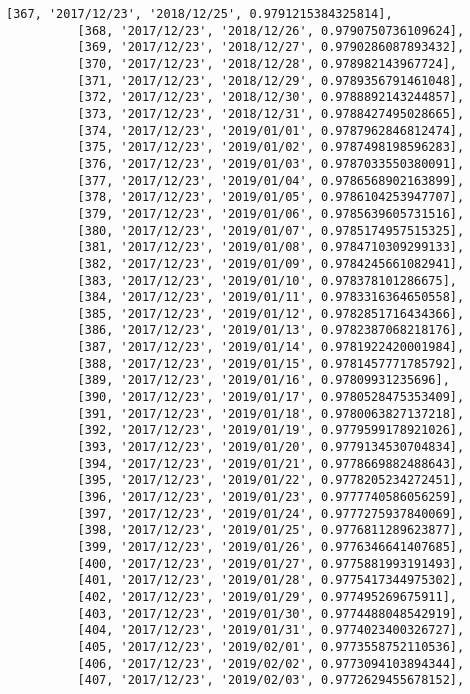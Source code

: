 \documentclass[11pt]{article}
\begin{document}
\begin{Verbatim}[commandchars=\\\{\}]
          [367, '2017/12/23', '2018/12/25', 0.9791215384325814],
          [368, '2017/12/23', '2018/12/26', 0.9790750736109624],
          [369, '2017/12/23', '2018/12/27', 0.9790286087893432],
          [370, '2017/12/23', '2018/12/28', 0.978982143967724],
          [371, '2017/12/23', '2018/12/29', 0.9789356791461048],
          [372, '2017/12/23', '2018/12/30', 0.9788892143244857],
          [373, '2017/12/23', '2018/12/31', 0.9788427495028665],
          [374, '2017/12/23', '2019/01/01', 0.9787962846812474],
          [375, '2017/12/23', '2019/01/02', 0.9787498198596283],
          [376, '2017/12/23', '2019/01/03', 0.9787033550380091],
          [377, '2017/12/23', '2019/01/04', 0.9786568902163899],
          [378, '2017/12/23', '2019/01/05', 0.9786104253947707],
          [379, '2017/12/23', '2019/01/06', 0.9785639605731516],
          [380, '2017/12/23', '2019/01/07', 0.9785174957515325],
          [381, '2017/12/23', '2019/01/08', 0.9784710309299133],
          [382, '2017/12/23', '2019/01/09', 0.9784245661082941],
          [383, '2017/12/23', '2019/01/10', 0.978378101286675],
          [384, '2017/12/23', '2019/01/11', 0.9783316364650558],
          [385, '2017/12/23', '2019/01/12', 0.9782851716434366],
          [386, '2017/12/23', '2019/01/13', 0.9782387068218176],
          [387, '2017/12/23', '2019/01/14', 0.9781922420001984],
          [388, '2017/12/23', '2019/01/15', 0.9781457771785792],
          [389, '2017/12/23', '2019/01/16', 0.97809931235696],
          [390, '2017/12/23', '2019/01/17', 0.9780528475353409],
          [391, '2017/12/23', '2019/01/18', 0.9780063827137218],
          [392, '2017/12/23', '2019/01/19', 0.9779599178921026],
          [393, '2017/12/23', '2019/01/20', 0.9779134530704834],
          [394, '2017/12/23', '2019/01/21', 0.9778669882488643],
          [395, '2017/12/23', '2019/01/22', 0.9778205234272451],
          [396, '2017/12/23', '2019/01/23', 0.9777740586056259],
          [397, '2017/12/23', '2019/01/24', 0.9777275937840069],
          [398, '2017/12/23', '2019/01/25', 0.9776811289623877],
          [399, '2017/12/23', '2019/01/26', 0.9776346641407685],
          [400, '2017/12/23', '2019/01/27', 0.9775881993191493],
          [401, '2017/12/23', '2019/01/28', 0.9775417344975302],
          [402, '2017/12/23', '2019/01/29', 0.977495269675911],
          [403, '2017/12/23', '2019/01/30', 0.9774488048542919],
          [404, '2017/12/23', '2019/01/31', 0.9774023400326727],
          [405, '2017/12/23', '2019/02/01', 0.9773558752110536],
          [406, '2017/12/23', '2019/02/02', 0.9773094103894344],
          [407, '2017/12/23', '2019/02/03', 0.9772629455678152],

\end{Verbatim}
\end{document}
